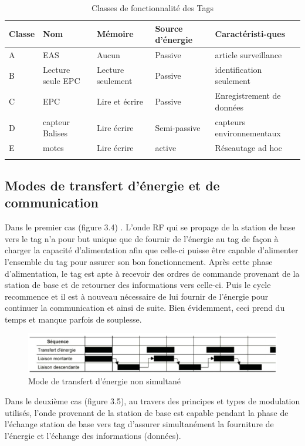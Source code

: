 \documentclass[11pt, a4paper, twoside]{book}
\begin{document}
\begin{longtable}{|p{}|p{}|p{}| p{}|p{}|}
\hline
\textbf{Classe} & \textbf{Nom} & \textbf{Mémoire} & \textbf{Source d'énergie} & \textbf{Caractéristi-ques} \\
\hline
A & EAS & Aucun & Passive & article surveillance \\
\hline
B & Lecture seule EPC & Lecture seulement & Passive & identification seulement \\
\hline
C & EPC & Lire et écrire & Passive & Enregistrement de données \\
\hline
D & capteur Balises & Lire écrire & Semi-passive & capteurs environnementaux \\
\hline
E & motes & Lire écrire & active & Réseautage ad hoc \\
\hline
\caption{Classes de fonctionnalité des Tags}
\end{longtable}

\subsection{Modes de transfert d’énergie et de communication}
Dans le premier cas (figure 3.4) . L’onde RF qui se propage de la station de base vers le tag n’a pour but unique que de fournir de l’énergie au tag de façon à charger la  capacité d’alimentation afin que celle-ci puisse être capable d’alimenter l’ensemble du tag pour assurer son bon fonctionnement. Après cette phase d'alimentation, le tag est apte à recevoir des ordres de commande provenant de la station de base et de retourner des informations vers celle-ci. Puis le cycle recommence et il est à nouveau nécessaire de lui fournir de l'énergie pour continuer la communication et ainsi de suite. Bien évidemment, ceci prend du temps et manque parfois de souplesse.\\
\begin{figure}[H]
\centering
\includegraphics[width=\textwidth]{figa}
\caption{Mode de transfert d'énergie non simultané}
\end{figure}

Dans le deuxième cas (figure 3.5), au travers des principes et types de modulation utilisés, l'onde provenant de la station de base est capable pendant la phase de l'échange station de base vers tag d'assurer simultanément la fourniture de l'énergie et l'échange des informations (données).\\
\end{document}
